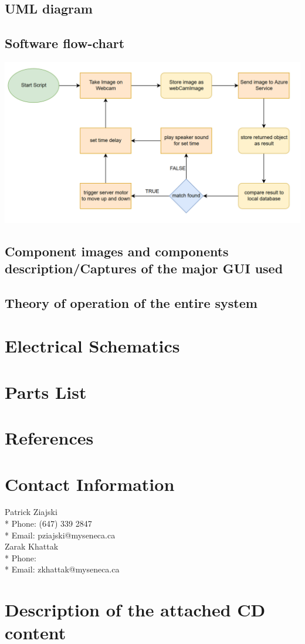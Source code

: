 \documentclass[a4paper,12pt]{article}
\begin{document}
\subsection{UML diagram}
\subsection{Software flow-chart}
\includegraphics[width = \linewidth]{../images/FlowChart.png}
\subsection{Component images and components description/Captures of the major GUI used}
\subsection{Theory of operation of the entire system}

\newpage
\appendix
\section{Electrical Schematics}
\section{Parts List}
\section{References}

\newpage
\section{Contact Information}
\begin{center}
    Patrick Ziajski \\*
    Phone: (647) 339 2847 \\*
    Email: pziajski@myseneca.ca \\
    \vspace{5mm}
    Zarak Khattak \\*
    Phone: \\*
    Email: zkhattak@myseneca.ca
\end{center}

\newpage
\section{Description of the attached CD content}
\end{document}
